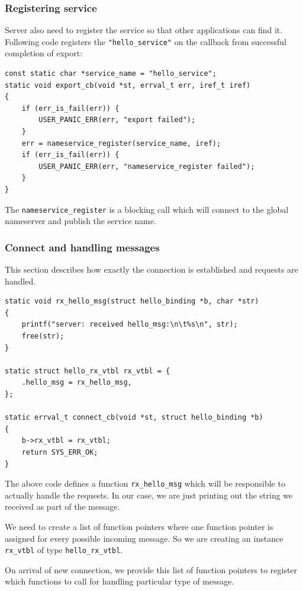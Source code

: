 \subsubsection{Registering service}
Server also need to register the service so that other applications can find
it.  Following code registers the \texttt{"hello\_service"} on the callback
from successful completion of export:


\begin{verbatim}
const static char *service_name = "hello_service";
static void export_cb(void *st, errval_t err, iref_t iref)
{
    if (err_is_fail(err)) {
        USER_PANIC_ERR(err, "export failed");
    }
    err = nameservice_register(service_name, iref);
    if (err_is_fail(err)) {
        USER_PANIC_ERR(err, "nameservice_register failed");
    }
}
\end{verbatim}

The \texttt{nameservice\_register} is a blocking call which will connect
to the global nameserver and publish the service name.

\subsubsection{Connect and handling messages}
This section describes how exactly the connection is established and
requests are handled.

\begin{verbatim}
static void rx_hello_msg(struct hello_binding *b, char *str)
{
    printf("server: received hello_msg:\n\t%s\n", str);
    free(str);
}

static struct hello_rx_vtbl rx_vtbl = {
    .hello_msg = rx_hello_msg,
};

static errval_t connect_cb(void *st, struct hello_binding *b)
{
    b->rx_vtbl = rx_vtbl;
    return SYS_ERR_OK;
}
\end{verbatim}

The above code defines a function \texttt{rx\_hello\_msg} which will be
responsible to actually handle the requests.  In our case, we are just
printing out the string we received as part of the message.

We need to create a list of function pointers where one function pointer
is assigned for every possible incoming message. So we are creating
an instance \texttt{rx\_vtbl} of type \texttt{hello\_rx\_vtbl}.

On arrival of new connection, we provide this list of function pointers
to register which functions to call for handling particular type of message.


